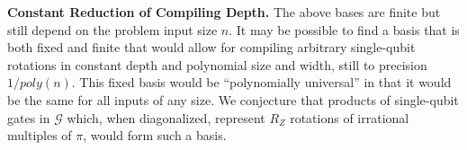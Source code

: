 \begin{conjecture}{\textbf{Constant Reduction of Compiling Depth.}}
The above bases are finite but still depend on the problem input
size $n$. It may be possible to find a basis that
is both fixed and finite that would allow for compiling
arbitrary single-qubit rotations in constant depth and polynomial
size and width, still to precision $1 / poly(n)$. This fixed
basis would be ``polynomially universal'' in that it would be
the same for all inputs of any size.
We conjecture that products of single-qubit gates in
$\mathcal{G}$ which, when diagonalized, represent $R_Z$ rotations
of irrational multiples of $\pi$, would form such a basis.
\end{conjecture}
